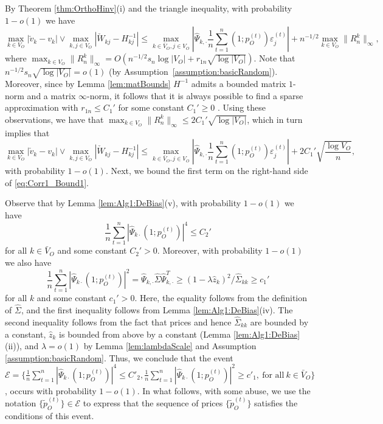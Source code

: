 \documentclass[opre,nonblindrev]{informs3} %
\def\Phk{\hat{\Psi}_{k,\cdot} }
\def\hPkdot{\hat \Psi_{k,\cdot}}
\def\hPkdot{\hat{\Psi}_{k,\cdot} }
\begin{document}
\begin{APPENDIX}{}
By Theorem \ref{thm:OrthoHinv}(i) and the triangle inequality, with probability $1-o(1)$ we have
$$\max_{k\in V_O} |\check v_k - v_k | \vee  \max_{k,j\in V_O} | \check W_{kj} - H^{-1}_{kj} | \leq \max_{k\in \bar{V}_O,j\in V_O}\left|
\hPkdot \frac{1}{n} \sum_{t=1}^n (1;p_O^{(t)}) \varepsilon_j^{(t)}\right| + n^{-1/2}\max_{k \in V_O} \|R_n^k\|_\infty ,  $$
where
$\max_{k \in V_O}\|R^k_n\|_\infty = O(n^{-1/2}s_n\log |V_O| + r_{1n}\sqrt{\log |V_O|})$.
Note that
 $n^{-1/2}s_n\sqrt{\log |V_O|} =o(1) $
(by Assumption~\ref{assumption:basicRandom}).
{Moreover,
since by Lemma \ref{lem:matBounds} $H^{-1}$ admits a bounded matrix $1$-norm and a matrix $\infty$-norm, it follows that
it is always possible to find a sparse approximation with
$r_{1n} \leq C_1'$ for some constant $C_1' \geq 0$ .}
Using these observations, we have that $\max_{k \in V_O} \|R^k_n\|_\infty \leq 2C_1'\sqrt{\log |V_O|}$, which in turn implies that
\begin{equation}\label{eq:Corr1_Bound1}
\max_{k\in V_O} |\check v_k - v_k | \vee\max_{k,j\in V_O} | \check W_{kj} - H^{-1}_{kj} | \leq \max_{k\in \bar{V}_O,j\in V_O}\left|
\hPkdot
 \frac{1}{n} \sum_{t=1}^n (1;p_O^{(t)}) \varepsilon_j^{(t)}\right| +2 C_1' \sqrt{\frac{\log V_O}{n}},
\end{equation}
with probability $1-o(1)$.
Next, we bound the first term on the right-hand side of
\eqref{eq:Corr1_Bound1}.


Observe that 	
by Lemma \ref{lem:Alg1:DeBias}(v), with probability $1-o(1)$ we have
\begin{equation} \label{eq:4thMomentBounded}
 \frac{1}{n}\sum_{t=1}^n|\hat \Psi_{k\cdot} (1;p_O^{(t)} )|^4 \leq C_2'
\end{equation}
for all $k\in \bar{V}_O$ and some constant $C_2'>0$. 
Moreover, with probability $1-o(1)$ we also have 
\begin{equation}
\frac{1}{n}\sum_{t=1}^n|\hat \Psi_{k\cdot} (1;p_O^{(t)} )|^2
= 
 \Phk \hat\Sigma  \Phk^T \geq (1 - \lambda \hat z_k)^2/\hat\Sigma_{kk}
 \geq c_1'
\end{equation}
	for all $k$ and some constant $c_1'>0$.
	Here, the equality follows from the definition of $\hat{ \Sigma}$, and
	the first inequality follows from Lemma \ref{lem:Alg1:DeBias}(iv).
	The second inequality follows from the fact that prices 
	and hence $\hat{\Sigma}_{kk}$ 
	are bounded by a constant,
	$\hat z_k$ is bounded from above by a constant (Lemma \ref{lem:Alg1:DeBias}(ii)),
	and $\lambda = o(1)$ by Lemma \ref{lem:lambdaScale} and Assumption \ref{assumption:basicRandom}.
	Thus, we conclude that the  event
$\mathcal{E}=\{  \frac{1}{n}\sum_{t=1}^n|\hat \Psi_{k\cdot} (1;p_O^{(t)} )|^4 \leq C'_2, \frac{1}{n}\sum_{t=1}^n|\hat \Psi_{k\cdot} (1;p_O^{(t)} )|^2 \geq c'_1, \ \mbox{for all} \ k\in \bar V_O \}$, occurs with probability $1-o(1)$.
In what follows,
with some abuse,
 we use the notation $\{\tilde{p}_O^{(t)}\} \in \mathcal{E}$ to express that the  sequence  of prices $\{\tilde{p}_O^{(t)}\}$ satisfies the conditions of this event.




\end{APPENDIX}
\end{document}
